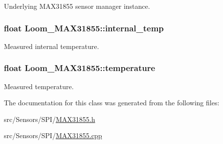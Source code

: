 Underlying M\+A\+X31855 sensor manager instance. 

\subsubsection[{\texorpdfstring{internal\+\_\+temp}{internal_temp}}]{\setlength{\rightskip}{0pt plus 5cm}float Loom\+\_\+\+M\+A\+X31855\+::internal\+\_\+temp\hspace{0.3cm}{\ttfamily [protected]}}\hypertarget{class_loom___m_a_x31855_a02476a27b49d4193d0534b732246fec4}{}\label{class_loom___m_a_x31855_a02476a27b49d4193d0534b732246fec4}


Measured internal temperature. 

\subsubsection[{\texorpdfstring{temperature}{temperature}}]{\setlength{\rightskip}{0pt plus 5cm}float Loom\+\_\+\+M\+A\+X31855\+::temperature\hspace{0.3cm}{\ttfamily [protected]}}\hypertarget{class_loom___m_a_x31855_a1e8c46105fee70cedcd505f25a58d62c}{}\label{class_loom___m_a_x31855_a1e8c46105fee70cedcd505f25a58d62c}


Measured temperature. 



The documentation for this class was generated from the following files\+:\begin{DoxyCompactItemize}
\item 
src/\+Sensors/\+S\+P\+I/\hyperlink{_m_a_x31855_8h}{M\+A\+X31855.\+h}\item 
src/\+Sensors/\+S\+P\+I/\hyperlink{_m_a_x31855_8cpp}{M\+A\+X31855.\+cpp}\end{DoxyCompactItemize}

